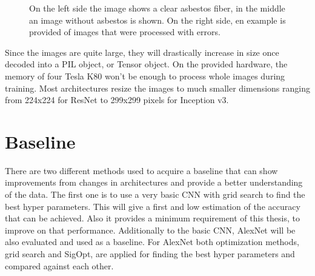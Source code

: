 \begin{figure}[t]
\centering
\caption{On the left side the image shows a clear asbestos fiber, in the middle an image without asbestos is shown. On the right side, en example is provided of images that were processed with errors.}
\label{fig:basic_examples}
\end{figure}

\newpage

Since the images are quite large, they will drastically increase in size once decoded into a PIL object, or Tensor object. On the provided hardware, the memory of four Tesla K80 won't be enough to process whole images during training. Most architectures resize the images to much smaller dimensions ranging from 224x224 for ResNet to 299x299 pixels for Inception v3.

\section{Baseline}

There are two different methods used to acquire a baseline that can show improvements from changes in architectures and provide a better understanding of the data. The first one is to use a very basic CNN with grid search to find the best hyper parameters. This will give a first and low estimation of the accuracy that can be achieved. Also it provides a minimum requirement of this thesis, to improve on that performance. Additionally to the basic CNN, AlexNet will be also evaluated and used as a baseline. For AlexNet both optimization methods, grid search and SigOpt, are applied for finding the best hyper parameters and compared against each other.\\

